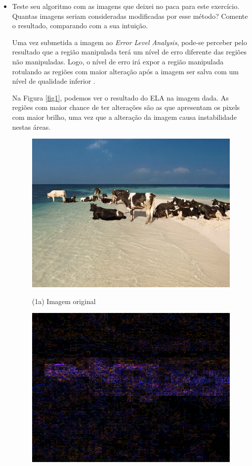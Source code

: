 \documentclass[12pt]{article}
\begin{document}
\begin{itemize}
\begin{itemize}
\item Teste seu algoritmo com as imagens que deixei no paca para este exercício. 
Quantas imagens seriam consideradas modificadas por esse método? Comente o resultado,
comparando com a sua intuição.

Uma vez submetida a imagem ao \textit{Error Level Analysis}, pode-se perceber pelo resultado que 
a região manipulada terá um nível de erro diferente das regiões não manipuladas. Logo, 
o nível de erro irá expor a região manipulada rotulando as regiões com maior alteração após
a imagem ser salva com um nível de qualidade inferior \cite{krawetz}.

Na Figura \ref{fig1}, podemos ver o resultado do ELA na imagem dada. As regiões com maior chance de ter
alterações são as que apresentam os pixels com maior brilho, uma vez que a alteração da imagem 
causa instabilidade nestas áreas.
\begin{figure}[htb]
\centering
\begin{minipage}[b]{0.45\textwidth}
	\centering
        \includegraphics[scale=0.3]{Q3Images/cows_on_beach.jpg}
	\centerline{\small (1a) Imagem original}
\end{minipage}
\begin{minipage}[b]{0.45\textwidth}
	\centering
        \includegraphics[scale=0.3]{Q3Images/cows_on_beach_ela.jpg} 

\end{minipage}
\end{figure}
\end{itemize}
\end{itemize}
\end{document}
